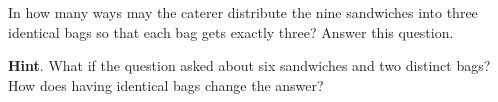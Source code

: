 \documentclass{book}
\begin{document}
\setcounter{cpjt}{279}
\addtocounter{cpjt}{-1}
\begin{activity}\label{caterer2}
\hypertarget{p-1420}{}%
In how many ways may the caterer distribute the nine sandwiches into three identical bags so that each bag gets exactly three? Answer this question.%
\par\smallskip%
\noindent\textbf{Hint}.\hypertarget{hint-181}{}\quad%
\hypertarget{p-1421}{}%
What if the question asked about six sandwiches and two distinct bags? How does having identical bags change the answer?%
\par\smallskip%
\noindent\end{activity}

\clearpage
\end{document}
